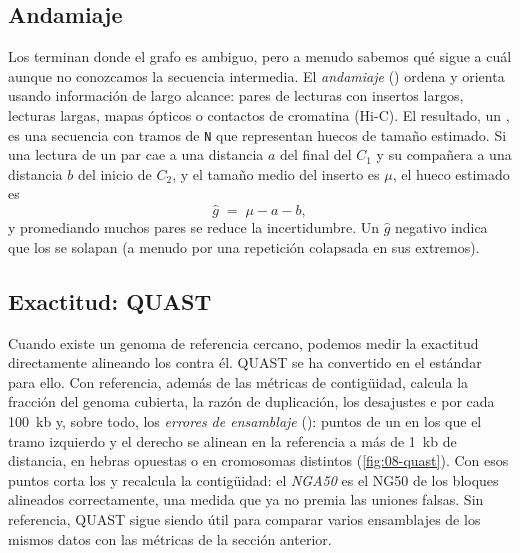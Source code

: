 \subsection{Andamiaje}

Los  terminan donde el grafo es ambiguo, pero a menudo sabemos qué  sigue a cuál aunque no conozcamos la secuencia intermedia. El \emph{andamiaje} () ordena y orienta  usando información de largo alcance: pares de lecturas con insertos largos, lecturas largas, mapas ópticos o contactos de cromatina (Hi-C). El resultado, un , es una secuencia con tramos de \texttt{N} que representan huecos de tamaño estimado. Si una lectura de un par cae a una distancia $a$ del final del  $C_1$ y su compañera a una distancia $b$ del inicio de $C_2$, y el tamaño medio del inserto es $\mu$, el hueco estimado es
\begin{equation}\label{eq:08-hueco}
\widehat{g} \;=\; \mu - a - b,
\end{equation}
y promediando muchos pares se reduce la incertidumbre. Un $\widehat{g}$ negativo indica que los  se solapan (a menudo por una repetición colapsada en sus extremos).

\begin{simbolos}
\end{simbolos}

\subsection{Exactitud: QUAST}

Cuando existe un genoma de referencia cercano, podemos medir la exactitud directamente alineando los  contra él. QUAST \parencite{c08-gurevich2013} se ha convertido en el estándar para ello. Con referencia, además de las métricas de contigüidad, calcula la fracción del genoma cubierta, la razón de duplicación, los desajustes e  por cada \SI{100}{kb} y, sobre todo, los \emph{errores de ensamblaje} (): puntos de un  en los que el tramo izquierdo y el derecho se alinean en la referencia a más de \SI{1}{kb} de distancia, en hebras opuestas o en cromosomas distintos (\cref{fig:08-quast}). Con esos puntos corta los  y recalcula la contigüidad: el \emph{NGA50} es el NG50 de los bloques alineados correctamente, una medida que ya no premia las uniones falsas. Sin referencia, QUAST sigue siendo útil para comparar varios ensamblajes de los mismos datos con las métricas de la sección anterior.

